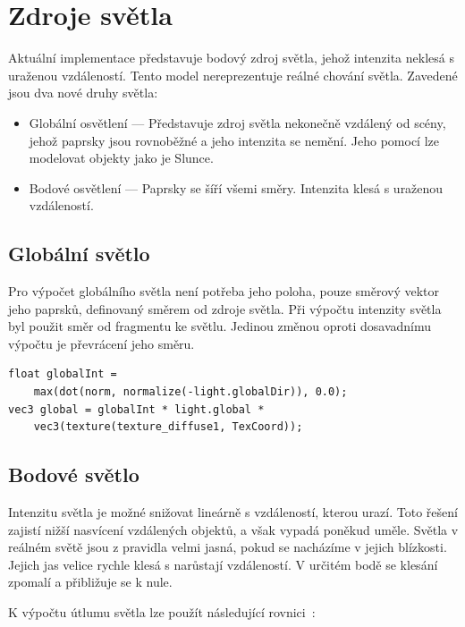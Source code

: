 \documentclass[thesis=M,czech]{FITthesis}[2019/12/23]
\begin{document}
\section{Zdroje světla}

Aktuální implementace představuje bodový zdroj světla, jehož intenzita neklesá s uraženou vzdáleností. Tento model nereprezentuje reálné chování světla. Zavedené jsou dva nové druhy světla:

\begin{itemize}
\item Globální osvětlení --- Představuje zdroj světla nekonečně vzdálený od scény, jehož paprsky jsou rovnoběžné a jeho intenzita se nemění. Jeho pomocí lze modelovat objekty jako je Slunce. 

\item Bodové osvětlení --- Paprsky se šíří všemi směry. Intenzita klesá s ura\-že\-nou vzdáleností.
\end{itemize}

\subsection{Globální světlo}

Pro výpočet globálního světla není potřeba jeho poloha, pouze směrový vektor jeho paprsků, definovaný směrem od zdroje světla. Při výpočtu intenzity světla byl použit směr od fragmentu ke světlu. Jedinou změnou oproti dosavadnímu výpočtu je převrácení jeho směru.

\begin{verbatim}
float globalInt = 
    max(dot(norm, normalize(-light.globalDir)), 0.0);
vec3 global = globalInt * light.global * 
    vec3(texture(texture_diffuse1, TexCoord));
\end{verbatim}

\subsection{Bodové světlo}

Intenzitu světla je možné snižovat lineárně s vzdáleností, kterou urazí. Toto řešení zajistí nižší nasvícení vzdálených objektů, a však vypadá poněkud uměle. Světla v reálném světě jsou z pravidla velmi jasná, pokud se nacházíme v jejich blízkosti. Jejich jas velice rychle klesá s narůstají vzdáleností. V určitém bodě se klesání zpomalí a přibližuje se k nule.

K výpočtu útlumu světla lze použít následující rovnici~\cite{lopgl_light_casters}:
\end{document}

